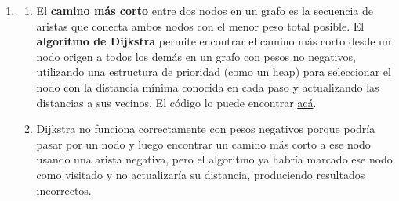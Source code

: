 \documentclass[12pt]{article}
\begin{document}
\begin{enumerate}
            \item 
            \begin{enumerate}[label=\alph*)]
                \item El \textbf{camino más corto} entre dos nodos en un grafo es la secuencia de aristas que conecta ambos nodos con el menor peso total posible. El \textbf{algoritmo de Dijkstra} permite encontrar el camino más corto desde un nodo origen a todos los demás en un grafo con pesos no negativos, utilizando una estructura de prioridad (como un heap) para seleccionar el nodo con la distancia mínima conocida en cada paso y actualizando las distancias a sus vecinos. El código lo puede encontrar \href{https://github.com/otrab/EDA/tree/ayudant%C3%ADas}{acá}.

                \item Dijkstra no funciona correctamente con pesos negativos porque podría pasar por un nodo y luego encontrar un camino más corto a ese nodo usando una arista negativa, pero el algoritmo ya habría marcado ese nodo como visitado y no actualizaría su distancia, produciendo resultados incorrectos.
            \end{enumerate}
        \end{enumerate}
\end{document}
